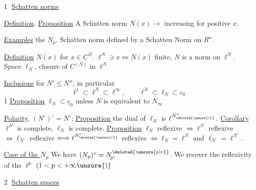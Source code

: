 

\textcircled{1} \uline{Schatten norms}

\uline{Definition}. \uline{Proposition} A Schatten norm $N(x)\to$ increasing for positive $x$. 

\uline{Examples} the $N_p$. Schatten norm defined by a Schatten Norm on $R^n$.

\uline{Definition} $N(x)$ for $x\in\underline C^{\underline N}$. $\ell^N\ni x\Longleftrightarrow N(x)$ finite, $N$ is a norm on $\ell^N$. Space $\ell_N$, closure of $C^{(\underline N)}$ in $\ell^N$

\uline{Inclusions} for $N'\leq N''$, in particular
\[
\ell^1\subset\ell^N\subset\ell^\infty,\qquad \ell^N\subset\ell_N\subset c_0
\]
1 \uline{Proposition} $\ell_N\subset\underline c_0$ unless $N$ is equivalent to $N_\infty$

\uline{Polarity}, $(N^\circ)^\circ=N^\circ$; \uline{Proposition} the dual of $\ell_N$ is $\ell^{N^{\circ}_{\deleted{\unsure{\prime}}}}$. \uline{Corollary} $\ell^N$ is complete, $\ell_N$ is complete. \uline{Proposition} $\ell_N$ reflexive $\Longleftrightarrow\ell^N$ reflexive $\Longleftrightarrow\ell_{N^\circ}$ reflexive $\Longleftrightarrow\ell^{N^{\circ}_{\deleted{\unsure{\prime}}}}$ reflexive $\Longleftrightarrow\ell_N=\ell^N$ and $\ell_{N^\circ}=\ell^{N^\circ}$.

 \uline{Case of the $N_p$} We have $(N_p)^\circ=N_{\!p'}^{\deleted{\unsure{p|\circ}}}$. We recover the reflexivity of the $\ell^p$ $(1<p<+\infty\unsure{)}$

\textcircled{2} \uline{Schatten spaces}



